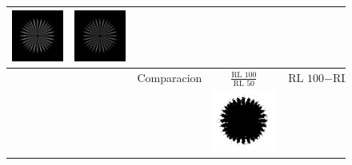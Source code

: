 \documentclass{./packages/optica-article}
\begin{document}
\begin{figure}
\begin{tabular}{c c | c c c}
		\includegraphics[scale=0.25]{Simulation deconvolution/ref_np_0.01/RL_50}            &
		\includegraphics[scale=0.25]{Simulation deconvolution/ref_np_0.01/RL_100}
		\\    \hline
		                                                                                    &   & Comparacion &
		$\frac{\textrm{RL 100}}{\textrm{RL 50}}$                                            &

		$\textrm{RL 100} - \textrm{RL 50}$
		\\	                                                                                     & & &
		\includegraphics[scale=0.25]{Simulation deconvolution/ref_np_0.01/RL_100_div_RL_50} &


\end{tabular}
\end{figure}
\end{document}

